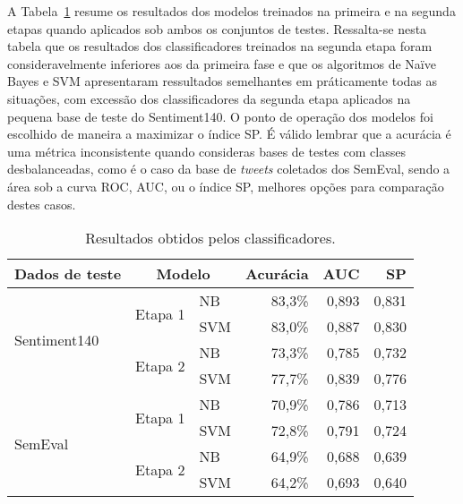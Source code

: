 A Tabela~\ref{tab:linear_perf} resume os resultados dos modelos treinados na primeira e na segunda etapas quando
aplicados sob ambos os conjuntos de testes.
Ressalta-se nesta tabela que os resultados dos classificadores treinados na segunda etapa foram consideravelmente
inferiores aos da primeira fase e que os algoritmos de Naïve Bayes e SVM apresentaram ressultados semelhantes em
práticamente todas as situações, com excessão dos classificadores da segunda etapa aplicados na pequena base de teste
do Sentiment140.
O ponto de operação dos modelos foi escolhido de maneira a maximizar o índice SP.
É válido lembrar que a acurácia é uma métrica inconsistente quando consideras bases de testes com classes
desbalanceadas, como é o caso da base de \textit{tweets} coletados dos SemEval, sendo a área sob a curva ROC, AUC, ou o
índice SP, melhores opções para comparação destes casos.

\begin{table}[h]
    \begin{center}
        \begin{tabular}{ |l|l|l|r|r|r| }
            \hline
            \textbf{Dados de teste} & \multicolumn{2}{|c|}{\textbf{Modelo}}  & \textbf{Acurácia} & \textbf{AUC} & \textbf{SP} \\ \hline
            \multirow{4}{*}{Sentiment140} & \multirow{2}{*}{Etapa 1} & NB  & 83,3\% & 0,893 & 0,831 \\ \cline{3-6}
                                          &                          & SVM & 83,0\% & 0,887 & 0,830 \\ \cline{2-6}
                                          & \multirow{2}{*}{Etapa 2} & NB  & 73,3\% & 0,785 & 0,732 \\ \cline{3-6}
                                          &                          & SVM & 77,7\% & 0,839 & 0,776 \\ \hline
            \multirow{4}{*}{SemEval}      & \multirow{2}{*}{Etapa 1} & NB  & 70,9\% & 0,786 & 0,713 \\ \cline{3-6}
                                          &                          & SVM & 72,8\% & 0,791 & 0,724 \\ \cline{2-6}
                                          & \multirow{2}{*}{Etapa 2} & NB  & 64,9\% & 0,688 & 0,639 \\ \cline{3-6}
                                          &                          & SVM & 64,2\% & 0,693 & 0,640 \\ \hline
        \end{tabular}
        \caption{Resultados obtidos pelos classificadores.}
        \label{tab:linear_perf}
    \end{center}
\end{table}

